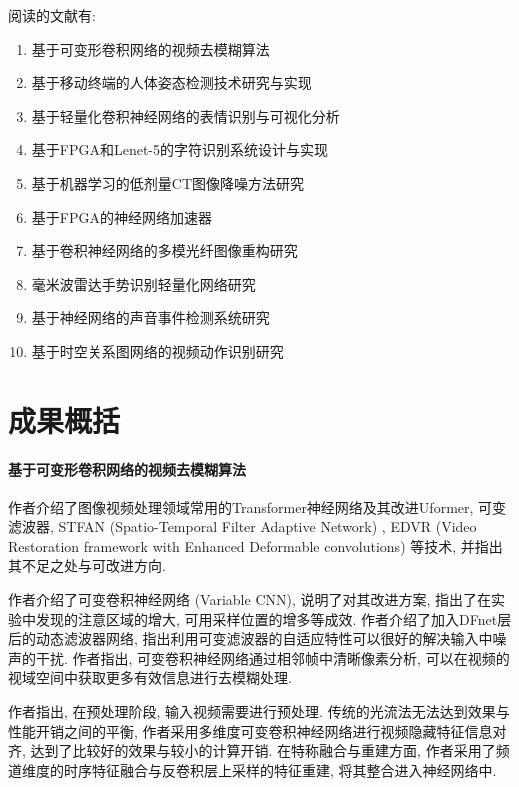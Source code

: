 \documentclass[]{ctexart}
\begin{document}
    阅读的文献有: 
    \begin{enumerate}[1)]
    	\item 基于可变形卷积网络的视频去模糊算法\cite{deblur}
    	\item 基于移动终端的人体姿态检测技术研究与实现\cite{bodyPosition}
    	\item 基于轻量化卷积神经网络的表情识别与可视化分析\cite{faceExp}
    	\item 基于FPGA和Lenet-5的字符识别系统设计与实现\cite{lenet-5}
    	\item 基于机器学习的低剂量CT图像降噪方法研究\cite{ctDenoise}
    	\item 基于FPGA的神经网络加速器\cite{fpgaAccelerate}
    	\item 基于卷积神经网络的多模光纤图像重构研究\cite{fiber}
    	\item 毫米波雷达手势识别轻量化网络研究\cite{radar}
    	\item 基于神经网络的声音事件检测系统研究\cite{sound}
    	\item 基于时空关系图网络的视频动作识别研究\cite{videoAction}
	\end{enumerate}
    
\section{成果概括}

\paragraph{基于可变形卷积网络的视频去模糊算法\cite{deblur}}作者介绍了图像视频处理领域常用的Transformer神经网络及其改进Uformer, 可变滤波器, STFAN (Spatio-Temporal Filter Adaptive Network) \cite{stfan}, EDVR (Video Restoration framework with Enhanced Deformable convolutions) \cite{edvr}等技术, 并指出其不足之处与可改进方向. 

    作者介绍了可变卷积神经网络 (Variable CNN), 说明了对其改进方案, 指出了在实验中发现的注意区域的增大, 可用采样位置的增多等成效. 作者介绍了加入DFnet层后的动态滤波器网络, 指出利用可变滤波器的自适应特性可以很好的解决输入中噪声的干扰. 作者指出, 可变卷积神经网络通过相邻帧中清晰像素分析, 可以在视频的视域空间中获取更多有效信息进行去模糊处理. 
    
    作者指出, 在预处理阶段, 输入视频需要进行预处理. 传统的光流法无法达到效果与性能开销之间的平衡, 作者采用多维度可变卷积神经网络进行视频隐藏特征信息对齐, 达到了比较好的效果与较小的计算开销. 在特称融合与重建方面, 作者采用了频道维度的时序特征融合与反卷积层上采样的特征重建, 将其整合进入神经网络中. 
    
\end{document}
